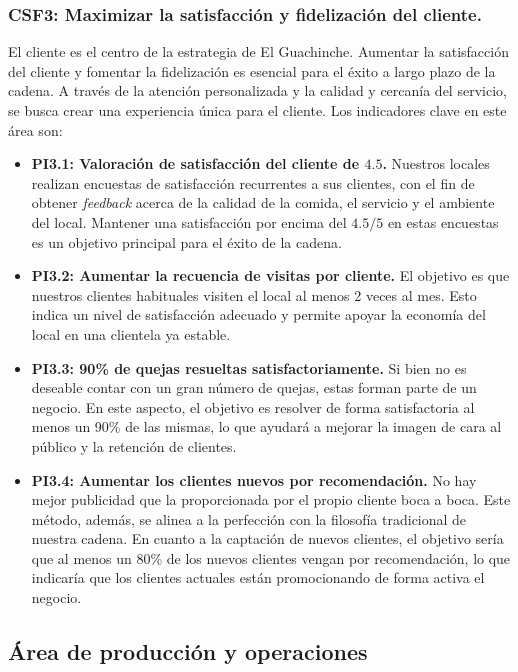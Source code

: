 \documentclass[12pt]{opticajnl}
\begin{document}
\subsubsection*{CSF3: Maximizar la satisfacción y fidelización del cliente.}

El cliente es el centro de la estrategia de El Guachinche. Aumentar la satisfacción del cliente y fomentar la fidelización es esencial para el éxito a largo plazo de la cadena. A través de la atención personalizada y la calidad y cercanía del servicio, se busca crear una experiencia única para el cliente. Los indicadores clave en este área son:

\begin{itemize}
    \item \textbf{PI3.1: Valoración de satisfacción del cliente de $4.5$.} Nuestros locales realizan encuestas de satisfacción recurrentes a sus clientes, con el fin de obtener \textit{feedback} acerca de la calidad de la comida, el servicio y el ambiente del local. Mantener una satisfacción por encima del $4.5/5$ en estas encuestas es un objetivo principal para el éxito de la cadena.
    \item \textbf{PI3.2: Aumentar la recuencia de visitas por cliente.} El objetivo es que nuestros clientes habituales visiten el local al menos 2 veces al mes. Esto indica un nivel de satisfacción adecuado y permite apoyar la economía del local en una clientela ya estable.
    \item \textbf{PI3.3: 90\% de quejas resueltas satisfactoriamente.} Si bien no es deseable contar con un gran número de quejas, estas forman parte de un negocio. En este aspecto, el objetivo es resolver de forma satisfactoria al menos un 90\% de las mismas, lo que ayudará a mejorar la imagen de cara al público y la retención de clientes.
    \item \textbf{PI3.4: Aumentar los clientes nuevos por recomendación.} No hay mejor publicidad que la proporcionada por el propio cliente boca a boca. Este método, además, se alinea a la perfección con la filosofía tradicional de nuestra cadena. En cuanto a la captación de nuevos clientes, el objetivo sería que al menos un 80\% de los nuevos clientes vengan por recomendación, lo que indicaría que los clientes actuales están promocionando de forma activa el negocio.
\end{itemize}

\subsection{Área de producción y operaciones}
\end{document}
